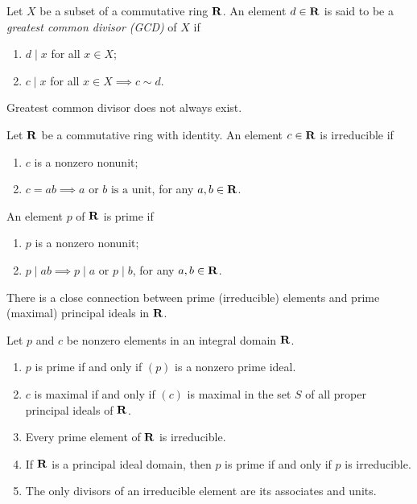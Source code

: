 \begin{defn}
Let $X$ be a subset of a commutative ring $\mathbf{R}$. An element $d \in \mathbf{R}$ 
is said to be a \emph{greatest common divisor (GCD)} of $X$ if 
\begin{enumerate}
    \item $d \mid x$ for all $x \in X$; 
    \item $c \mid x$ for all $x \in X \implies c \sim d$. 
\end{enumerate}
\end{defn}
Greatest common divisor does not always exist. 

\begin{defn}
Let $\mathbf{R}$ be a commutative ring with identity. An element $c \in \mathbf{R}$ is 
irreducible if 
\begin{enumerate}
    \item $c$ is a nonzero nonunit;
    \item $c = ab \implies a \text{ or } b \text{ is a unit}$, for any 
    $a, b \in \mathbf{R}$.
\end{enumerate}
An element $p$ of $\mathbf{R}$ is prime if 
\begin{enumerate}
    \item $p$ is a nonzero nonunit;
    \item $p \mid ab \implies p \mid a \text{ or } p \mid b$, for any 
    $a, b \in \mathbf{R}$.
\end{enumerate}
\end{defn}

There is a close connection between prime (\resp irreducible) elements and 
prime (\resp maximal) principal ideals in $\mathbf{R}$. 

\begin{thm}
\label{thm:connection_between_principal_ideals}
Let $p$ and $c$ be nonzero elements in an integral domain $\mathbf{R}$. 
\begin{enumerate}
    \item \label{thm:connection_between_principal_ideals:1} 
    $p$ is prime if and only if $(p)$ is a nonzero prime ideal. 
    \item \label{thm:connection_between_principal_ideals:2}
    $c$ is maximal if and only if $(c)$ is maximal in the set $S$ 
    of all proper principal ideals of $\mathbf{R}$.
    \item \label{thm:connection_between_principal_ideals:3}
    Every prime element of $\mathbf{R}$ is irreducible. 
    \item \label{thm:connection_between_principal_ideals:4}
    If $\mathbf{R}$ is a principal ideal domain, then $p$ is prime if and only if 
    $p$ is irreducible. 
    \item \label{thm:connection_between_principal_ideals:6}
    The only divisors of an irreducible element are its associates and units.
\end{enumerate}
\end{thm}

